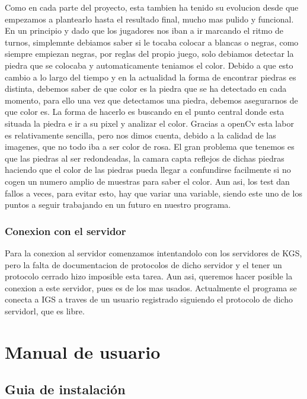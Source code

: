 \documentclass[12pt,a4paper]{report}
\begin{document}
Como en cada parte del proyecto, esta tambien ha tenido su evolucion desde que
empezamos a plantearlo hasta el resultado final, mucho mas pulido y funcional.
En un principio y dado que los jugadores nos iban a ir marcando el ritmo de
turnos, simplemnte debiamos saber si le tocaba colocar a blancas o negras, como
siempre empiezan negras, por reglas del propio juego, solo debiamos detectar la
piedra que se colocaba y automaticamente teniamos el color.  Debido a que esto
cambio a lo largo del tiempo y en la actualidad la forma de encontrar piedras es
distinta, debemos saber de que color es la piedra que se ha detectado en cada
momento, para ello una vez que detectamos una piedra, debemos asegurarnos de que
color es. La forma de hacerlo es buscando en el punto central donde esta situada
la piedra e ir a su pixel y analizar el color. Gracias a openCv esta labor es
relativamente sencilla, pero nos dimos cuenta, debido a la calidad de las
imagenes, que no todo iba a ser color de rosa. El gran problema que tenemos es
que las piedras al ser redondeadas, la camara capta reflejos de dichas piedras
haciendo que el color de las piedras pueda llegar a confundirse facilmente si no
cogen un numero amplio de muestras para saber el color. Aun asi, los test dan
fallos a veces, para evitar esto, hay que variar una variable, siendo este uno
de los puntos a seguir trabajando en un futuro en nuestro programa.


\subsection{Conexion con el servidor}

Para la conexion al servidor comenzamos intentandolo con los servidores de KGS,
pero la falta de documentacion de protocolos de dicho servidor y el tener un
protocolo cerrado hizo imposible esta tarea. Aun asi, queremos hacer posible la
conexion a este servidor, pues es de los mas usados. Actualmente el programa se
conecta a IGS a traves de un usuario registrado siguiendo el protocolo de dicho
servidorl, que es libre.


\chapter{Manual de usuario}

\section{Guia de instalación} 
\end{document}
